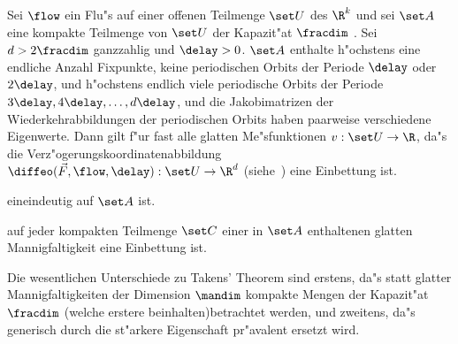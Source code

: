 \begin{theorem}
  Sei $\flow$ ein Flu"s auf einer offenen Teilmenge $\set U$ des $\R^k$ und sei $\set A$
  eine kompakte Teilmenge von $\set U$ der Kapazit"at $\fracdim$ . Sei $d>2\fracdim$ ganzzahlig und $\delay>0$. $\set A$ enthalte
  h"ochstens eine endliche Anzahl Fixpunkte, keine periodischen Orbits der Periode
  $\delay$ oder $2\delay$, und h"ochstens endlich viele periodische Orbits der Periode
  $3\delay,4\delay,\dots,d\delay$, und die Jakobimatrizen der Wiederkehrabbildungen der
  periodischen Orbits haben paarweise verschiedene Eigenwerte. Dann
  gilt f"ur fast alle glatten Me"sfunktionen $v:\set U\to\R$, da"s die
  Verz"ogerungskoordinatenabbildung $\diffeo(\vec F,\flow,\delay):\set U\to\R^d$
  (siehe~) eine Einbettung ist.
\begin{myitemize}
\item eineindeutig auf $\set A$ ist.
\item auf jeder kompakten Teilmenge $\set C$ einer in $\set A$ enthaltenen 
  glatten Mannigfaltigkeit eine Einbettung ist.
\end{myitemize}
\end{theorem}

Die wesentlichen Unterschiede zu Takens' Theorem sind erstens, da"s statt glatter
Mannigfaltigkeiten der Dimension $\mandim$ kompakte Mengen der Kapazit"at $\fracdim$
(welche erstere beinhalten)betrachtet werden, und zweitens, da"s generisch durch die
st"arkere Eigenschaft pr"avalent ersetzt wird.

